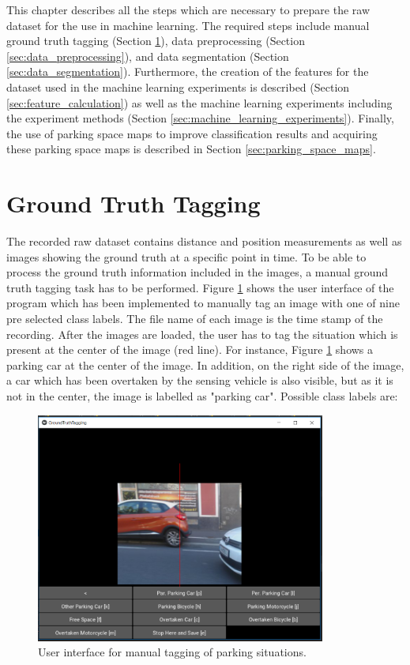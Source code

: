 This chapter describes all the steps which are necessary to prepare the raw dataset for the use in machine learning. The required steps include manual ground truth tagging (Section \ref{sec:ground_truth_tagging}), data preprocessing (Section \ref{sec:data_preprocessing}), and data segmentation (Section \ref{sec:data_segmentation}). 
Furthermore, the creation of the features for the dataset used in the machine learning experiments is described (Section \ref{sec:feature_calculation}) as well as the machine learning experiments including the experiment methods (Section \ref{sec:machine_learning_experiments}).
Finally, the use of parking space maps to improve classification results and acquiring these parking space maps is described in Section \ref{sec:parking_space_maps}.





\section{Ground Truth Tagging}
\label{sec:ground_truth_tagging}

The recorded raw dataset contains distance and position measurements as well as images showing the ground truth at a specific point in time. To be able to process the ground truth information included in the images, a manual ground truth tagging task has to be performed. Figure \ref{fig:ground_truth_tagging_ui} shows the user interface of the program which has been implemented to manually tag an image with one of nine pre selected class labels. The file name of each image is the time stamp of the recording. After the images are loaded, the user has to tag the situation which is present at the center of the image (red line). For instance, Figure \ref{fig:ground_truth_tagging_ui} shows a parking car at the center of the image. In addition, on the right side of the image, a car which has been overtaken by the sensing vehicle is also visible, but as it is not in the center, the image is labelled as "parking car".
Possible class labels are: 

\begin{figure}
	\centering
	\includegraphics[width=0.85\textwidth]{img/ground_truth_tagging_ui.PNG}
	\caption{User interface for manual tagging of parking situations. }
	\label{fig:ground_truth_tagging_ui}
\end{figure}

